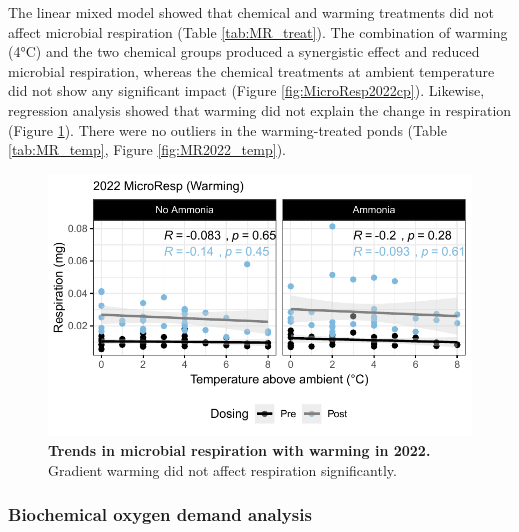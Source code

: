\documentclass[11pt, a4paper]{article}
\begin{document}
\begin{spacing}{1.5}
The linear mixed model showed that chemical and warming treatments did not affect microbial respiration (Table \ref{tab:MR_treat}). The combination of warming (4°C) and the two chemical groups produced a synergistic effect and reduced microbial respiration, whereas the chemical treatments at ambient temperature did not show any significant impact (Figure \ref{fig:MicroResp2022cp}). Likewise, regression analysis showed that warming did not explain the change in respiration (Figure \ref{fig:MR2022Regression}). There were no outliers in the warming-treated ponds (Table \ref{tab:MR_temp}, Figure \ref{fig:MR2022_temp}).

\begin{figure}[H]
    \centering
    \includegraphics[scale=1]{./Figures/Regression_MicroResp}
    \caption{\textbf{Trends in microbial respiration with warming in 2022.} Gradient warming did not affect respiration significantly.}
    \label{fig:MR2022Regression}
\end{figure}

\subsubsection{Biochemical oxygen demand analysis}


\end{spacing}
\end{document}
